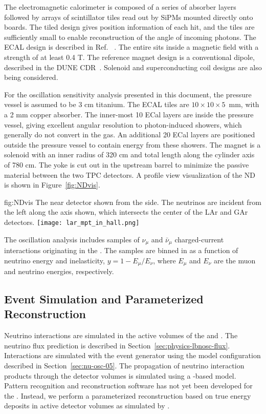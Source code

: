 The electromagnetic calorimeter is composed of a series of absorber layers followed by arrays of scintillator tiles read out by SiPMs mounted directly onto boards. The tiled design gives \threed position information of each hit, and the tiles are sufficiently small to enable reconstruction of the angle of incoming photons. The ECAL design is described in Ref. ~\cite{Emberger:2018pgr}. The entire  sits inside a magnetic field with a strength of at least 0.4 T. The reference magnet design is a conventional dipole, described in the DUNE CDR~\cite{Acciarri:2016ooe}. Solenoid and superconducting coil designs are also being considered.

For the oscillation sensitivity analysis presented in this document, the pressure vessel is assumed to be 3 cm titanium. The ECAL tiles are $10 \times 10 \times 5$~mm, with a 2 mm copper absorber. The inner-most 10 ECal layers are inside the pressure vessel, giving excellent angular resolution to photon-induced showers, which generally do not convert in the gas. An additional 20 ECal layers are positioned outside the pressure vessel to contain energy from these showers. The magnet is a solenoid with an inner radius of 320 cm and total length along the cylinder axis of 780 cm. The yoke is cut out in the upstream barrel to minimize the passive material between the two TPC detectors. A profile view visualization of the ND is shown in Figure~\ref{fig:NDvis}.

\begin{dunefigure}[ND visualization]{fig:NDvis}
{The near detector shown from the side. The neutrinos are incident from the left along the axis shown, which intersects the center of the LAr and GAr detectors.}
 \texttt{[image: lar\_mpt\_in\_hall.png]}
\end{dunefigure}

The oscillation analysis includes samples of $\nu_{\mu}$ and $\bar{\nu}_{\mu}$ charged-current interactions originating in the . The samples are binned in \twod as a function of neutrino energy and inelasticity, $y = 1 - E_{\mu}/E_{\nu}$, where $E_{\mu}$ and $E_{\nu}$ are the muon and neutrino energies, respectively. 

\subsection{Event Simulation and Parameterized Reconstruction}
\label{sec:ndsimreco}

Neutrino interactions are simulated in the active volumes of the  and  . The neutrino flux prediction is described in Section~\ref{sec:physics-lbnosc-flux}. Interactions are simulated with the  event generator using the model configuration described in Section~\ref{sec:nu-osc-05}. The propagation of neutrino interaction products through the detector volumes is simulated using a -based model. Pattern recognition and reconstruction software has not yet been developed for the . Instead, we perform a parameterized reconstruction based on true energy deposits in active detector volumes as simulated by .

